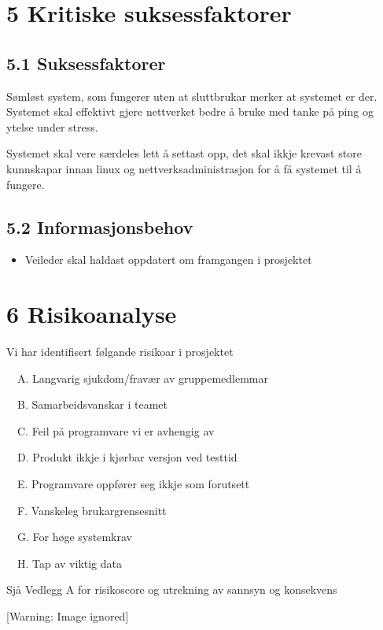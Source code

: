 \documentclass[12pt]{article}
\begin{document}
\section{5 Kritiske suksessfaktorer}

\subsection{5.1 Suksessfaktorer}

Sømløst system, som fungerer uten at sluttbrukar merker at systemet er der. Systemet skal effektivt gjere nettverket bedre å bruke med tanke på ping og ytelse under stress. 




Systemet skal vere særdeles lett å settast opp, det skal ikkje krevast store kunnskapar innan linux og nettverksadministrasjon for å få systemet til å fungere.

\subsection{5.2 Informasjonsbehov}

\begin{itemize}
\item Veileder skal haldast oppdatert om framgangen i prosjektet 
\end{itemize}
\section{6 Risikoanalyse}

Vi har identifisert følgande risikoar i prosjektet

\ \ A. Langvarig sjukdom/fravær av gruppemedlemmar

\ \ B. Samarbeidsvanskar i teamet

\ \ C. Feil på programvare vi er avhengig av

\ \ D. Produkt ikkje i kjørbar versjon ved testtid

\ \ E. Programvare oppfører seg ikkje som forutsett

\ \ F. Vanskeleg brukargrensesnitt

\ \ G. For høge systemkrav

\ \ H. Tap av viktig data




Sjå Vedlegg A for risikoscore og utrekning av sannsyn og konsekvens

  [Warning: Image ignored] %
 
\end{document}
